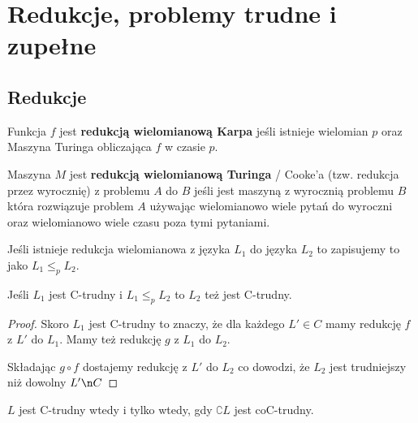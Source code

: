 \section{Redukcje, problemy trudne i zupełne}
\subsection{Redukcje}

\begin{definition}
    Funkcja \( f \) jest \textbf{redukcją wielomianową Karpa} jeśli istnieje wielomian \( p \) oraz Maszyna Turinga obliczająca \( f \) w czasie \( p \). 
\end{definition}

\begin{definition}
    Maszyna \( M \) jest \textbf{redukcją wielomianową Turinga} / Cooke'a (tzw. redukcja przez wyrocznię) z problemu \(A\) do \(B\) jeśli jest maszyną z wyrocznią problemu \(B\) która rozwiązuje problem
    \(A\) używając wielomianowo wiele pytań do wyroczni oraz wielomianowo wiele czasu poza tymi pytaniami.
\end{definition}

\begin{definition}
    Jeśli istnieje redukcja wielomianowa z języka \( L_1 \) do języka \( L_2 \) to zapisujemy to jako \( L_1 \leq_p L_2 \).
\end{definition}

\begin{lemma}
    Jeśli \( L_1 \) jest C-trudny i \( L_1 \leq_p L_2 \) to \( L_2 \) też jest C-trudny. 
\end{lemma}

\begin{proof}
    Skoro \( L_1 \) jest C-trudny to znaczy, że dla każdego \( L' \in C \) mamy redukcję \( f \) z \( L' \) do \( L_1 \).
    Mamy też redukcję \( g \) z \( L_1 \) do \( L_2 \).
    
    Składając \( g \circ f \) dostajemy redukcję z \( L' \)  do \( L_2 \) co dowodzi, że \( L_2 \) jest trudniejszy niż dowolny \( L' \n C \)
\end{proof}

\begin{lemma}
    \( L \) jest C-trudny wtedy i tylko wtedy, gdy \( \complement{L} \) jest  coC-trudny. 
\end{lemma}

